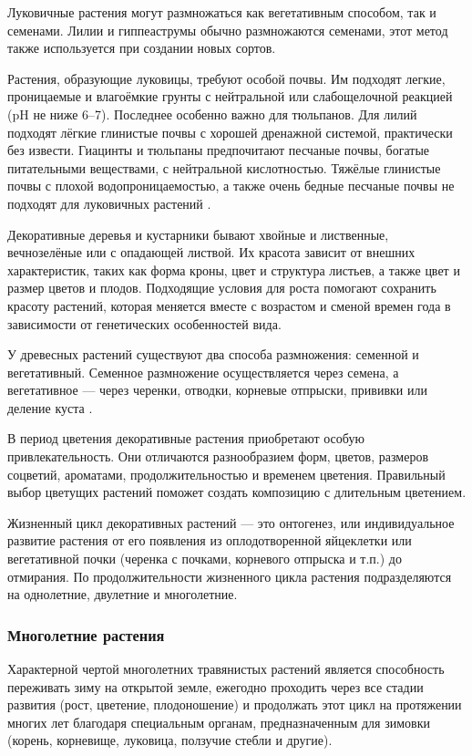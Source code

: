 Луковичные растения могут размножаться как вегетативным способом, так и семенами. Лилии и гиппеаструмы обычно размножаются семенами, этот метод также используется при создании новых сортов.

Растения, образующие луковицы, требуют особой почвы. Им подходят легкие, проницаемые и влагоёмкие грунты с нейтральной или слабощелочной реакцией (pH не ниже 6–7). Последнее особенно важно для тюльпанов. Для лилий подходят лёгкие глинистые почвы с хорошей дренажной системой, практически без извести. Гиацинты и тюльпаны предпочитают песчаные почвы, богатые питательными веществами, с нейтральной кислотностью. Тяжёлые глинистые почвы с плохой водопроницаемостью, а также очень бедные песчаные почвы не подходят для луковичных растений \cite{doroshenko}.

Декоративные деревья и кустарники бывают хвойные и лиственные, вечнозелёные или с опадающей листвой. Их красота зависит от внешних характеристик, таких как форма кроны, цвет и структура листьев, а также цвет и размер цветов и плодов. Подходящие условия для роста помогают сохранить красоту растений, которая меняется вместе с возрастом и сменой времен года в зависимости от генетических особенностей вида.

У древесных растений существуют два способа размножения: семенной и вегетативный. Семенное размножение осуществляется через семена, а вегетативное — через черенки, отводки, корневые отпрыски, прививки или деление куста \cite{berd}.

В период цветения декоративные растения приобретают особую привлекательность. Они отличаются разнообразием форм, цветов, размеров соцветий, ароматами, продолжительностью и временем цветения. Правильный выбор цветущих растений поможет создать композицию с длительным цветением.

Жизненный цикл декоративных растений — это онтогенез, или индивидуальное развитие растения от его появления из оплодотворенной яйцеклетки или вегетативной почки (черенка с почками, корневого отпрыска и т.п.) до отмирания. По продолжительности жизненного цикла растения подразделяются на однолетние, двулетние и многолетние.

\subsubsection{Многолетние растения}

Характерной чертой многолетних травянистых растений является способность переживать зиму на открытой земле, ежегодно проходить через все стадии развития (рост, цветение, плодоношение) и продолжать этот цикл на протяжении многих лет благодаря специальным органам, предназначенным для зимовки (корень, корневище, луковица, ползучие стебли и другие).

